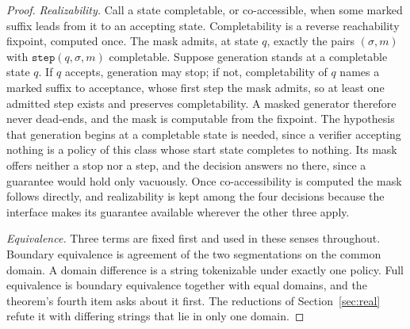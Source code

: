 \documentclass[11pt,a4paper]{article}
\theoremstyle{definition}
\theoremstyle{plain}
\newcommand{\code}[1]{\texttt{#1}}
\begin{document}
\begin{proof}
\emph{Realizability.} Call a state completable, or co-accessible, when some marked suffix leads from it to an accepting
state. Completability is a reverse reachability fixpoint, computed once. The mask admits, at state $q$, exactly the
pairs $(\sigma, m)$ with $\code{step}(q, \sigma, m)$ completable. Suppose generation stands at a completable state $q$.
If $q$ accepts, generation may stop; if not, completability of $q$ names a marked suffix to acceptance, whose first step
the mask admits, so at least one admitted step exists and preserves completability. A masked generator therefore never
dead-ends, and the mask is computable from the fixpoint. The hypothesis that generation begins at a completable state is
needed, since a verifier accepting nothing is a policy of this class whose start state completes to nothing. Its mask
offers neither a stop nor a step, and the decision answers no there, since a guarantee would hold only vacuously. Once
co-accessibility is computed the mask follows directly, and realizability is kept among the four decisions because the
interface makes its guarantee available wherever the other three apply.

\emph{Equivalence.} Three terms are fixed first and used in these senses throughout. Boundary equivalence is agreement
of the two segmentations on the common domain. A domain difference is a string tokenizable under exactly one policy.
Full equivalence is boundary equivalence together with equal domains, and the theorem's fourth item asks about it first.
The reductions of Section~\ref{sec:real} refute it with differing strings that lie in only one domain.


\end{proof}
\end{document}

